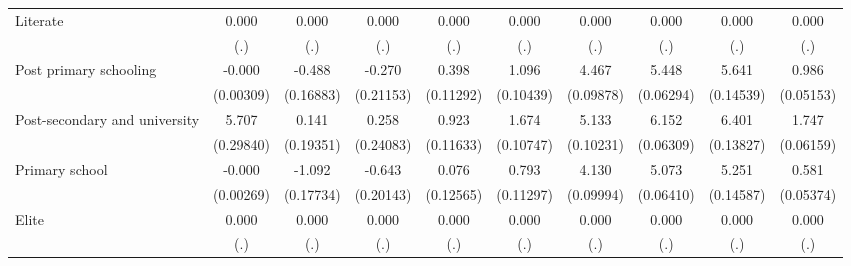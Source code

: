 {\begin{tabular}{l*{9}{c}}
Literate            &       0.000         &       0.000         &       0.000         &       0.000         &       0.000         &       0.000         &       0.000         &       0.000         &       0.000         \\
                    &         (.)         &         (.)         &         (.)         &         (.)         &         (.)         &         (.)         &         (.)         &         (.)         &         (.)         \\
Post primary schooling&      -0.000         &      -0.488\sym{**} &      -0.270         &       0.398\sym{***}&       1.096\sym{***}&       4.467\sym{***}&       5.448\sym{***}&       5.641\sym{***}&       0.986\sym{***}\\
                    &   (0.00309)         &   (0.16883)         &   (0.21153)         &   (0.11292)         &   (0.10439)         &   (0.09878)         &   (0.06294)         &   (0.14539)         &   (0.05153)         \\
Post-secondary and university&       5.707\sym{***}&       0.141         &       0.258         &       0.923\sym{***}&       1.674\sym{***}&       5.133\sym{***}&       6.152\sym{***}&       6.401\sym{***}&       1.747\sym{***}\\
                    &   (0.29840)         &   (0.19351)         &   (0.24083)         &   (0.11633)         &   (0.10747)         &   (0.10231)         &   (0.06309)         &   (0.13827)         &   (0.06159)         \\
Primary school      &      -0.000         &      -1.092\sym{***}&      -0.643\sym{**} &       0.076         &       0.793\sym{***}&       4.130\sym{***}&       5.073\sym{***}&       5.251\sym{***}&       0.581\sym{***}\\
                    &   (0.00269)         &   (0.17734)         &   (0.20143)         &   (0.12565)         &   (0.11297)         &   (0.09994)         &   (0.06410)         &   (0.14587)         &   (0.05374)         \\
Elite               &       0.000         &       0.000         &       0.000         &       0.000         &       0.000         &       0.000         &       0.000         &       0.000         &       0.000         \\
                    &         (.)         &         (.)         &         (.)         &         (.)         &         (.)         &         (.)         &         (.)         &         (.)         &         (.)         \\

\end{tabular}}
